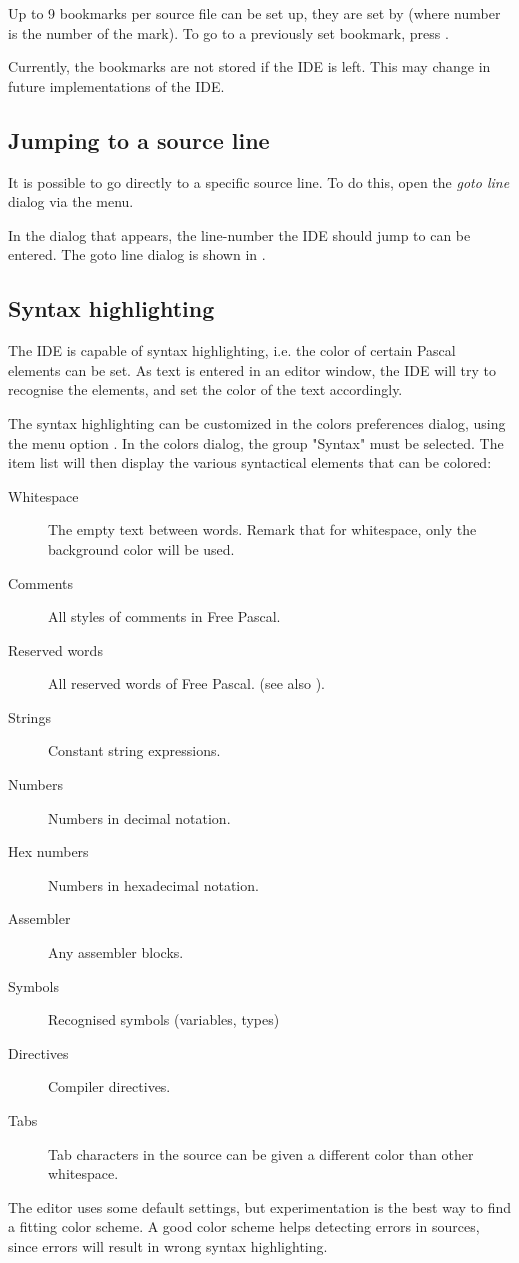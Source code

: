 Up to 9 bookmarks per source file can be set up, they are set by
 (where number is the number of the mark).
To go to a previously set bookmark, press .

\begin{remark}
Currently, the bookmarks are not stored if the IDE is left. This may
change in future implementations of the IDE.
\end{remark}

%
%
\subsection{Jumping to a source line}
It is possible to go directly to a specific source line. To do this, open
the {\em goto line} dialog via the  menu.

In the dialog that appears, the line-number the IDE should jump to can be
entered. The goto line dialog is shown in .


%
%
\subsection{Syntax highlighting}
\label{se:syntaxhighlighting}
The IDE is capable of syntax highlighting, i.e. the color of certain 
Pascal elements can be set. As text is entered in an editor window, 
the IDE will try to recognise the elements, and set the color of the
text accordingly.


The syntax highlighting can be customized in the colors preferences dialog,
using the menu option . In the colors dialog, the
group "Syntax" must be selected. The item list will then display the 
various syntactical elements that can be colored:
\begin{description}
\item[Whitespace] The empty text between words. Remark that for whitespace,
only the background color will be used.
\item[Comments] All styles of comments in Free Pascal.
\item[Reserved words] All reserved words of Free Pascal. (see also ).
\item[Strings] Constant string expressions.
\item[Numbers] Numbers in decimal notation.
\item[Hex numbers] Numbers in hexadecimal notation.
\item[Assembler] Any assembler blocks.
\item[Symbols] Recognised symbols (variables, types)
\item[Directives] Compiler directives.
\item[Tabs] Tab characters in the source can be given a different color than 
other whitespace.
\end{description}
The editor uses some default settings, but experimentation is the best way
to find a fitting color scheme. A good color scheme helps detecting errors
in sources, since errors will result in wrong syntax highlighting. 

